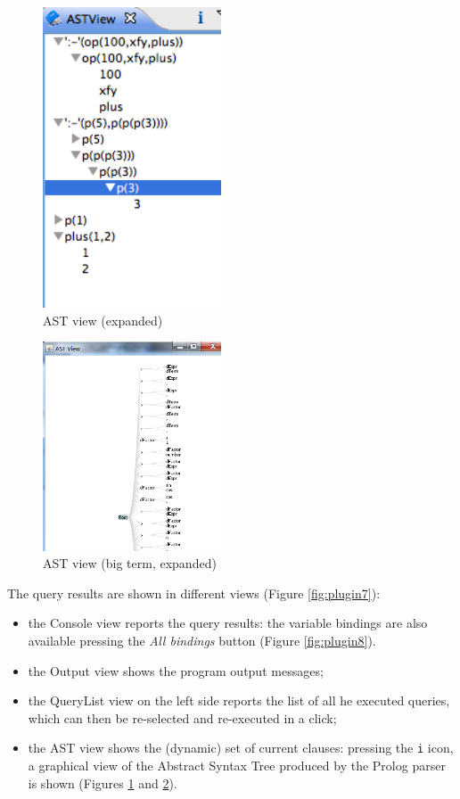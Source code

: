 \begin{figure}
\centering
  \includegraphics[width=200px]{images/plugin9.png}
  \caption{AST view (expanded)}\label{fig:plugin9}
\end{figure}

\begin{figure}
\centering
  \includegraphics[width=200px]{images/plugin10.png}
  \caption{AST view (big term, expanded)}\label{fig:plugin10}
\end{figure}

The query results are shown in different views (Figure \ref{fig:plugin7}):
\begin{itemize}
  \item the \tuprolog{} Console view reports the query results: the variable bindings are also available pressing the \textit{All bindings} button (Figure \ref{fig:plugin8}).
  \item the Output view shows the program output messages;
  \item the QueryList view on the left side reports the list of all he executed queries, which can then be re-selected and re-executed in a click;
  \item the AST view shows the (dynamic) set of current clauses: pressing the \texttt{i} icon, a graphical view of the Abstract Syntax Tree produced by the Prolog parser is shown (Figures \ref{fig:plugin9} and \ref{fig:plugin10}).
\end{itemize}


